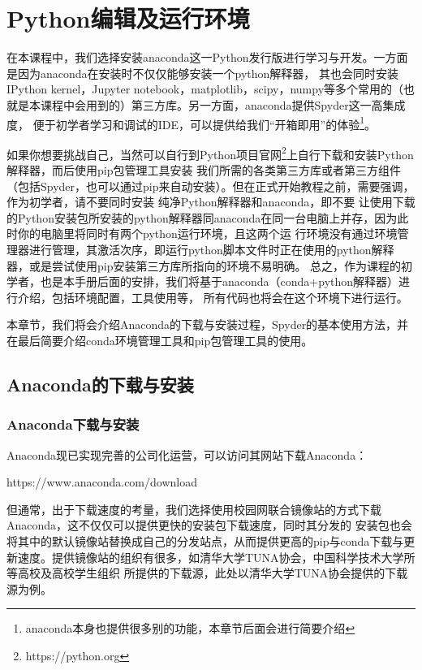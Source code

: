 \chapter{Python编辑及运行环境}
\lstset{style=bash}
在本课程中，我们选择安装anaconda这一Python发行版进行学习与开发。一方面是因为anaconda在安装时不仅仅能够安装一个python解释器，
其也会同时安装IPython kernel，Jupyter notebook，matplotlib，scipy，numpy等多个常用的（也就是本课程中会用到的）第三方库。另一方面，anaconda提供Spyder这一高集成度，
便于初学者学习和调试的IDE，可以提供给我们“开箱即用”的体验\footnote{anaconda本身也提供很多别的功能，本章节后面会进行简要介绍}。

如果你想要挑战自己，当然可以自行到Python项目官网\footnote{https://python.org}上自行下载和安装Python解释器，而后使用pip包管理工具安装
我们所需的各类第三方库或者第三方组件（包括Spyder，也可以通过pip来自动安装）。但在正式开始教程之前，需要强调，作为初学者，请不要同时安装
纯净Python解释器和anaconda，即不要
让使用下载的Python安装包所安装的python解释器同anaconda在同一台电脑上并存，因为此时你的电脑里将同时有两个python运行环境，且这两个运
行环境没有通过环境管理器进行管理，其激活次序，即运行python脚本文件时正在使用的python解释器，或是尝试使用pip安装第三方库所指向的环境不易明确。
总之，作为课程的初学者，也是本手册后面的安排，我们将基于anaconda（conda+python解释器）进行介绍，包括环境配置，工具使用等，
所有代码也将会在这个环境下进行运行。

本章节，我们将会介绍Anaconda的下载与安装过程，Spyder的基本使用方法，并在最后简要介绍conda环境管理工具和pip包管理工具的使用。
\section{Anaconda的下载与安装}
\subsection{Anaconda下载与安装}
Anaconda现已实现完善的公司化运营，可以访问其网站下载Anaconda：

https://www.anaconda.com/download

但通常，出于下载速度的考量，我们选择使用校园网联合镜像站的方式下载Anaconda，这不仅仅可以提供更快的安装包下载速度，同时其分发的
安装包也会将其中的默认镜像站替换成自己的分发站点，从而提供更高的pip与conda下载与更新速度。提供镜像站的组织有很多，如清华大学TUNA协会，中国科学技术大学所等高校及高校学生组织
所提供的下载源，此处以清华大学TUNA协会提供的下载源为例。

